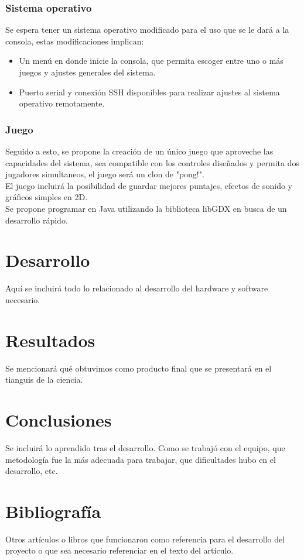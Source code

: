 \documentclass[letterpaper]{article}
\begin{document}
\begin{multicols}{2}
\subsubsection{Sistema operativo}
Se espera tener un sistema operativo modificado para el uso que se le dará a
la consola, estas modificaciones implican:
\begin{itemize}
    \item Un menú en donde inicie la consola, que permita escoger entre uno o
        más juegos y ajustes generales del sistema.
    \item Puerto serial y conexión SSH disponibles para realizar ajustes al
        sistema operativo remotamente.
\end{itemize}


\subsubsection{Juego}
Seguido a esto, se propone la creación de un único juego que aproveche las
capacidades del sistema, sea compatible con los controles diseñados y permita
dos jugadores simultaneos, el juego será un clon de "pong!".\\
El juego incluirá la posibilidad de guardar mejores puntajes, efectos de sonido
y gráficos simples en 2D.\\
Se propone programar en Java utilizando la biblioteca libGDX en busca de un
desarrollo rápido.

\section{Desarrollo}
Aquí se incluirá todo lo relacionado al desarrollo del hardware y software
necesario.

\section{Resultados}
Se mencionará qué obtuvimos como producto final que se presentará en el tianguis
de la ciencia.

\section{Conclusiones}
Se incluirá lo aprendido tras el desarrollo. Como se trabajó con el equipo, que
metodología fue la más adecuada para trabajar, que dificultades hubo en el
desarrollo, etc.

\section{Bibliografía}
Otros artículos o libros que funcionaron como referencia para el desarrollo del
proyecto o que sea necesario referenciar en el texto del artículo.

\end{multicols}
\end{document}
